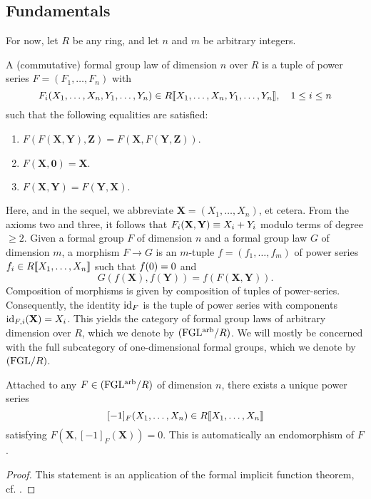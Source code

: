 \documentclass[../main.tex]{subfiles}
\begin{document}
\subsection{Fundamentals} %
\label{sub:Basic Notions}
For now, let $R$ be any ring, and let $n$ and $m$ be arbitrary integers.
\begin{defi}
  A (commutative) formal group law  of dimension
  $n$ over $R$ is a tuple of
  power series $F = (F_1, \dots, F_n)$ with $$F_i(X_1, \dots, X_n,Y_1,
  \dots, Y_n) \in R\llbracket X_1, \dots,
  X_n, Y_1, \dots, Y_n\rrbracket, \quad 1 \leq i \leq n$$
  such that  the following equalities are satisfied:
  \begin{enumerate}
    \item $F(F (\mathbf X, \mathbf Y), \mathbf Z) = 
      F(\mathbf X, F(\mathbf Y, \mathbf Z))$.
    \item $F( \mathbf X, \mathbf 0) = \mathbf X$.
    \item $F( \mathbf X, \mathbf Y) = F(\mathbf Y, \mathbf X).$
  \end{enumerate}
  Here, and in the sequel, we abbreviate $\mathbf X =
  (X_1, \dots, X_n)$, et cetera. From the axioms two and three, it follows that 
  $F_i(\mathbf{X}, \mathbf{Y}) \equiv X_i + Y_i$ modulo terms of degree $\geq 2$.
  Given a formal group $F$ of dimension $n$ and a formal group law
  $G$ of dimension $m$,
  a morphism $F \to G$ is an $m$-tuple $f = (f_1, \dots, f_m)$ 
  of power series $f_i \in R\llbracket X_1, \dots, X_n \rrbracket$ such that ${f}(0)=0$ and
  \begin{equation*}
    G(f( \mathbf X), f( \mathbf Y) ) = f(F( \mathbf X, \mathbf Y)).
  \end{equation*}
  Composition of morphisms is given by composition of tuples of power-series. 
  Consequently, the identity $\operatorname{id}_{F}$ is the tuple of power series with
  components $\operatorname{id}_{F,i}( \mathbf X) = X_i$. 
  This yields the category of formal group laws of arbitrary dimension over $R$,
  which we denote by ${(\mathrm{FGL^{arb}}/{R})}$. We will mostly be concerned with the full
  subcategory of one-dimensional formal groups, which we denote by ${(\mathrm{FGL}/{R})}$. 
\end{defi}

\begin{lem}\label{lem:FGLAdditive}
    Attached to any $F \in {(\mathrm{FGL^{arb}}/{R})}$ of dimension $n$, there exists
      a unique power series 
      $$[-1]_F(X_1, \dots, X_n) \in R\llbracket X_1, \dots, X_n\rrbracket$$
      satisfying $F(\mathbf X, [-1]_F(\mathbf X)) = 0$. This is automatically
      an endomorphism of $F$. 
\end{lem}
\begin{proof}
    This statement is an application of the formal implicit function theorem,
    cf. \cite[Theorem A.4.7]{hazewinkel1978formal}.   
\end{proof}
\end{document}
